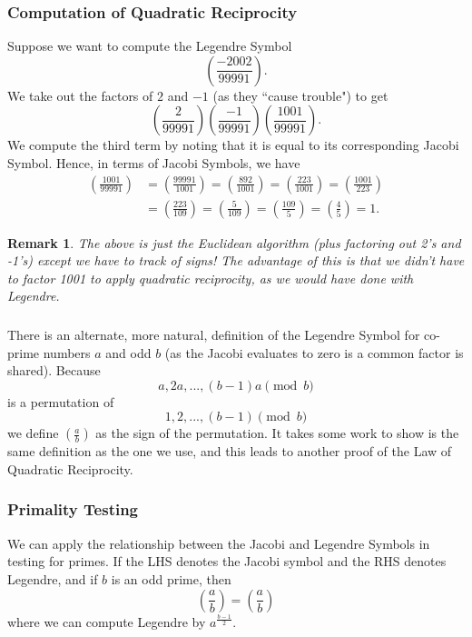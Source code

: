 \documentclass[12pt]{article}
\newtheorem*{remark}{Remark}
\newcommand{\legendre}[2]{\genfrac{(}{)}{}{}{#1}{#2}}
\newcommand{\jacobi}[2]{\genfrac{(}{)}{}{}{#1}{#2}}
\begin{document}
\subsubsection{Computation of Quadratic Reciprocity}
Suppose we want to compute the Legendre Symbol
\begin{equation*}
    \legendre{-2002}{99991}.
\end{equation*}
We take out the factors of $2$ and $-1$ (as they ``cause trouble") to get
\begin{equation}
    \legendre{2}{99991}\legendre{-1}{99991}\legendre{1001}{99991}.
\end{equation}
We compute the third term by noting that it is equal to its corresponding Jacobi Symbol. Hence, in terms of Jacobi Symbols, we have
\begin{equation}
\begin{split}
    \jacobi{1001}{99991} &= \jacobi{99991}{1001}
    = \jacobi{892}{1001} = \jacobi{223}{1001} = \jacobi{1001}{223}\\
    &= \jacobi{223}{109}  = \jacobi{5}{109} = \jacobi{109}{5} = \jacobi{4}{5} = 1.  
\end{split}
\end{equation}
\begin{remark}
    The above is just the Euclidean algorithm (plus factoring out 2's and -1's) except we have to track of signs! The advantage of this is that we didn't have to factor 1001 to apply quadratic reciprocity, as we would have done with Legendre.
\end{remark}
\subsubsection{}
There is an alternate, more natural, definition of the Legendre Symbol for co-prime numbers $a$ and odd $b$ (as the Jacobi evaluates to zero is a common factor is shared). Because
\begin{equation}
    a, 2a, ..., (b-1)a \pmod{b}
\end{equation}
is a permutation of
\begin{equation}
    1, 2, ..., (b-1) \pmod{b}
\end{equation}
we define $\jacobi{a}{b}$ as the sign of the permutation. It takes some work to show is the same definition as the one we use, and this leads to another proof of the Law of Quadratic Reciprocity.

\subsubsection{Primality Testing}
We can apply the relationship between the Jacobi and Legendre Symbols in testing for primes. If the LHS denotes the Jacobi symbol and the RHS denotes Legendre, and if $b$ is an odd prime, then
\begin{equation}
    \jacobi{a}{b} = \legendre{a}{b}
\end{equation}
where we can compute Legendre by $a^{\frac{b-1}{2}}$.
\end{document}
